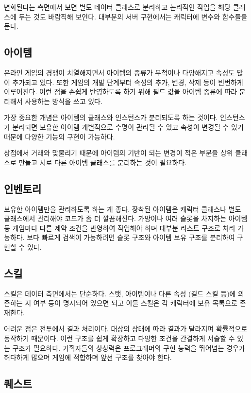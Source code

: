 \documentclass[chapter,kosection, 10.5pt, romanfixed, a4paper]{oblivoir}
\begin{document}
변화된다는 측면에서 보면 별도 데이터 클래스로 분리하고 논리적인 작업을 해당 클래스에 
두는 것도 바람직해 보인다. 대부분의 서버 구현에서는 캐릭터에 변수와 함수들을 둔다. 

\subsection{아이템}

온라인 게임의 경쟁이 치열해지면서 아이템의 종류가 무척이나 다양해지고 속성도 많이 추가되고 있다. 
또한 게임의 개발 단계부터 속성의 추가, 변경, 삭제 등이 빈번하게 이루어진다. 이런 점을 손쉽게 반영하도록 
하기 위해 필드 값을 아이템 종류에 따라 분리해서 사용하는 방식을 쓰고 있다. 

가장 중요한 개념은 아이템의 클래스와 인스턴스가 분리되도록 하는 것이다. 인스턴스가 분리되면 
보유한 아이템 개별적으로 수명이 관리될 수 있고 속성이 변경될 수 있기 때문에 다양한 기능의 구현이 
가능하다.  

상점에서 거래와 맞물리기 때문에 아이템의 기반이 되는 변경이 적은 부분을 상위 클래스로 만들고 서로 다른
아이템 클래스를 분리하는 것이 필요하다.

\subsection{인벤토리}

보유한 아이템만을 관리하도록 하는 게 좋다. 장착된 아이템은 캐릭터 클래스나 별도 클래스에서 관리해야 
코드가 좀 더 깔끔해진다. 가방이나 여러 슬롯을 차지하는 아이템 등 게임마다 다른 제약 조건을 반영하여 
작업해야 하며 대부분 리스트 구조로 처리 가능하다. 보다 빠르게 검색이 가능하려면 슬롯 구조와 아이템 보유 구조를
분리하여 구현할 수 있다. 

\subsection{스킬}

스킬은 데이터 측면에서는 단순하다. 스탯, 아이템이나 다른 속성 (길드 스킬 등)에 의존하는 지 여부 등이 
명시되어 있으면 되고 이들 스킬은 각 캐릭터에 보유 목록으로 존재한다.  

어려운 점은 전투에서 결과 처리이다. 대상의 상태에 따라 결과가 달라지며 확률적으로 동작하기 때문이다. 
이런 구조를 쉽게 확장하고 다양한 조건을 간결하게 서술할 수 있는 구조가 필요하다. 기획자들의 상상력은
프로그래머의 구현 능력을 뛰어넘는 경우가 허다하게 많으며 게임에 적합하며 앞선 구조를 찾아야 한다. 

\subsection{퀘스트}
\end{document}
